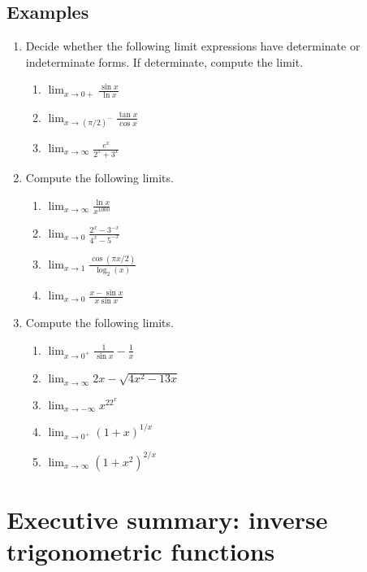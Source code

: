 \subsection*{Examples}
\begin{enumerate}
  \item Decide whether the following limit expressions have determinate or indeterminate forms. If determinate, compute the limit.
  \begin{enumerate}
    \item $\displaystyle\lim_{x\to 0+}\frac{\sin x}{\ln x}$
    \item $\displaystyle\lim_{x\to (\pi/2)^-}\frac{\tan x}{\cos x}$
    \item $\displaystyle\lim_{x\to\infty}\frac{e^x}{2^x+3^x}$
  \end{enumerate}
  \item Compute the following limits.
  \begin{enumerate}
    \item $\displaystyle\lim_{x\to\infty}\frac{\ln x}{x^{1000}}$
    \item $\displaystyle\lim_{x\to 0}\frac{2^x-3^{-x}}{4^x-5^{-x}}$
    \item $\displaystyle\lim_{x\to 1}\frac{\cos(\pi x/2)}{\log_2(x)}$
    \item $\displaystyle\lim_{x\to 0}\frac{x-\sin x}{x\sin x}$
  \end{enumerate}
  \item Compute the following limits.
  \begin{enumerate}
    \item $\displaystyle\lim_{x\to 0^+}\frac{1}{\sin x}-\frac{1}{x}$
    \item $\displaystyle\lim_{x\to \infty}2x-\sqrt{4x^2-13x}$
    \item $\displaystyle\lim_{x\to -\infty}x^22^{x}$
    \item $\displaystyle\lim_{x\to 0^+}(1+x)^{1/x}$
    \item $\displaystyle\lim_{x\to \infty}(1+x^2)^{2/x}$
  \end{enumerate}
\end{enumerate}




\newpage

\section{Executive summary: inverse trigonometric functions}


